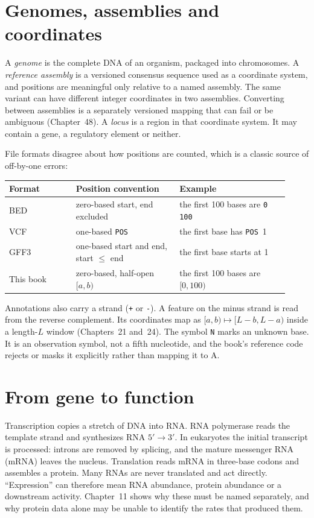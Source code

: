\section{Genomes, assemblies and coordinates}
A \emph{genome} is the complete DNA of an organism, packaged into chromosomes. A
\emph{reference assembly} is a versioned consensus sequence used as a coordinate system,
and positions are meaningful only relative to a named assembly. The same variant can
have different integer coordinates in two assemblies. Converting between assemblies is
a separately versioned mapping that can fail or be ambiguous (Chapter~48). A
\emph{locus} is a region in that coordinate system. It may contain a gene, a regulatory
element or neither.

File formats disagree about how positions are counted, which is a classic source of
off-by-one errors:
\begin{center}\small
\begin{tabular}{@{}P{0.22\linewidth}P{0.34\linewidth}P{0.36\linewidth}@{}}
\toprule
Format & Position convention & Example\\\midrule
BED & zero-based start, end excluded~\cite{ucscformats} & the first 100 bases are \texttt{0 100}\\
VCF & one-based \texttt{POS}~\cite{vcfspec} & the first base has \texttt{POS}~1\\
GFF3 & one-based start and end, start $\le$ end~\cite{gff3spec} & the first base starts at 1\\
This book & zero-based, half-open $[a,b)$ & the first 100 bases are $[0,100)$\\
\bottomrule
\end{tabular}
\end{center}
Annotations also carry a strand (\texttt{+} or \texttt{-}). A feature on the minus
strand is read from the reverse complement. Its coordinates map as $[a,b)\mapsto
[L-b,L-a)$ inside a length-$L$ window (Chapters~21 and~24). The symbol \texttt{N}
marks an unknown base. It is an observation symbol, not a fifth nucleotide, and the
book's reference code rejects or masks it explicitly rather than mapping it to A.

\section{From gene to function}
Transcription copies a stretch of DNA into RNA. RNA polymerase reads the template
strand and synthesizes RNA $5'\to3'$. In eukaryotes the initial transcript is
processed: introns are removed by splicing, and the mature messenger RNA (mRNA) leaves
the nucleus. Translation reads mRNA in three-base codons and assembles a protein. Many
RNAs are never translated and act directly. ``Expression'' can therefore mean RNA
abundance, protein abundance or a downstream activity. Chapter~11 shows why these must
be named separately, and why protein data alone may be unable to identify the rates
that produced them.

